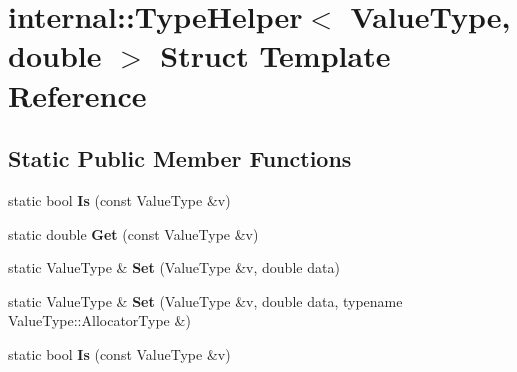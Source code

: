 \hypertarget{structinternal_1_1_type_helper_3_01_value_type_00_01double_01_4}{}\section{internal\+:\+:Type\+Helper$<$ Value\+Type, double $>$ Struct Template Reference}
\label{structinternal_1_1_type_helper_3_01_value_type_00_01double_01_4}
\subsection*{Static Public Member Functions}
\begin{DoxyCompactItemize}
\item 
static bool {\bfseries Is} (const Value\+Type \&v)\hypertarget{structinternal_1_1_type_helper_3_01_value_type_00_01double_01_4_a6c265a3202beb9bd85ecc7896a8ab9dd}{}\label{structinternal_1_1_type_helper_3_01_value_type_00_01double_01_4_a6c265a3202beb9bd85ecc7896a8ab9dd}

\item 
static double {\bfseries Get} (const Value\+Type \&v)\hypertarget{structinternal_1_1_type_helper_3_01_value_type_00_01double_01_4_ac55a96d2abd1dd6718a6cb3d6690aa38}{}\label{structinternal_1_1_type_helper_3_01_value_type_00_01double_01_4_ac55a96d2abd1dd6718a6cb3d6690aa38}

\item 
static Value\+Type \& {\bfseries Set} (Value\+Type \&v, double data)\hypertarget{structinternal_1_1_type_helper_3_01_value_type_00_01double_01_4_a2b332dd6083278283289e107caff879b}{}\label{structinternal_1_1_type_helper_3_01_value_type_00_01double_01_4_a2b332dd6083278283289e107caff879b}

\item 
static Value\+Type \& {\bfseries Set} (Value\+Type \&v, double data, typename Value\+Type\+::\+Allocator\+Type \&)\hypertarget{structinternal_1_1_type_helper_3_01_value_type_00_01double_01_4_a69f7d942a569f3acdeb64127b2ecd9eb}{}\label{structinternal_1_1_type_helper_3_01_value_type_00_01double_01_4_a69f7d942a569f3acdeb64127b2ecd9eb}

\item 
static bool {\bfseries Is} (const Value\+Type \&v)\hypertarget{structinternal_1_1_type_helper_3_01_value_type_00_01double_01_4_a6c265a3202beb9bd85ecc7896a8ab9dd}{}\label{structinternal_1_1_type_helper_3_01_value_type_00_01double_01_4_a6c265a3202beb9bd85ecc7896a8ab9dd}


\end{DoxyCompactItemize}
